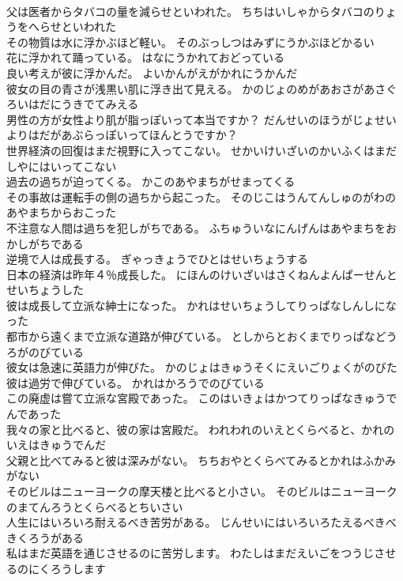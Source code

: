 \documentclass[8pt]{extreport}
\begin{document}
\begin{CJK}{UTF8}{min}
\\	父は医者からタバコの量を減らせといわれた。	ちちはいしゃからタバコのりょうをへらせといわれた 
\\	その物質は水に浮かぶほど軽い。	そのぶっしつはみずにうかぶほどかるい 
\\	花に浮かれて踊っている。	はなにうかれておどっている 
\\	良い考えが彼に浮かんだ。	よいかんがえがかれにうかんだ 
\\	彼女の目の青さが浅黒い肌に浮き出て見える。	かのじょのめがあおさがあさぐろいはだにうきでてみえる 
\\	男性の方が女性より肌が脂っぽいって本当ですか？	だんせいのほうがじょせいよりはだがあぶらっぽいってほんとうですか？ 
\\	世界経済の回復はまだ視野に入ってこない。	せかいけいざいのかいふくはまだしやにはいってこない 
\\	過去の過ちが迫ってくる。	かこのあやまちがせまってくる 
\\	その事故は運転手の側の過ちから起こった。	そのじこはうんてんしゅのがわのあやまちからおこった 
\\	不注意な人間は過ちを犯しがちである。	ふちゅういなにんげんはあやまちをおかしがちである 
\\	逆境で人は成長する。	ぎゃっきょうでひとはせいちょうする 
\\	日本の経済は昨年４％成長した。	にほんのけいざいはさくねんよんぱーせんとせいちょうした 
\\	彼は成長して立派な紳士になった。	かれはせいちょうしてりっぱなしんしになった 
\\	都市から遠くまで立派な道路が伸びている。	としからとおくまでりっぱなどうろがのびている 
\\	彼女は急速に英語力が伸びた。	かのじょはきゅうそくにえいごりょくがのびた 
\\	彼は過労で伸びている。	かれはかろうでのびている 
\\	この廃虚は嘗て立派な宮殿であった。	このはいきょはかつてりっぱなきゅうでんであった 
\\	我々の家と比べると、彼の家は宮殿だ。	われわれのいえとくらべると、かれのいえはきゅうでんだ 
\\	父親と比べてみると彼は深みがない。	ちちおやとくらべてみるとかれはふかみがない 
\\	そのビルはニューヨークの摩天楼と比べると小さい。	そのビルはニューヨークのまてんろうとくらべるとちいさい 
\\	人生にはいろいろ耐えるべき苦労がある。	じんせいにはいろいろたえるべきべきくろうがある 
\\	私はまだ英語を通じさせるのに苦労します。	わたしはまだえいごをつうじさせるのにくろうします 

\end{CJK}
\end{document}

